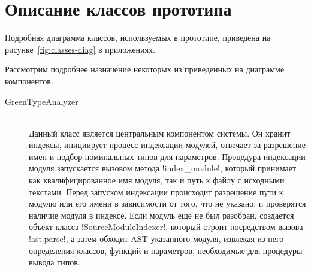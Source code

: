 \section{Описание классов прототипа}
\label{sec:classes-description}

Подробная диаграмма классов, используемых в прототипе, приведена на
 рисунке~\ref{fig:classes-diag} в приложениях.

Рассмотрим подробнее назначение некоторых из приведенных на диаграмме компонентов.

\begin{description}
  \item[GreenTypeAnalyzer] \hfill \\
    Данный класс является центральным компонентом системы. Он хранит индексы,
    инициирует процесс индексации модулей, отвечает за разрешение имен и подбор
    номинальных типов для параметров. Процедура индексации модуля запускается
    вызовом метода !index_module!, который принимает как квалифицированное имя
    модуля, так и путь к файлу с исходными текстами. Перед запуском индексации
    происходит разрешение пути к модулю или его имени в зависимости от того,
    что не указано, и проверятся наличие модуля в индексе. Если модуль еще не
    был разобран, создается объект класса !SourceModuleIndexer!, который
    строит посредством вызова !ast.parse!, а затем обходит AST указанного
    модуля, извлекая из него определения классов, функций и параметров,
    необходимые для процедуры вывода типов.


\end{description}
